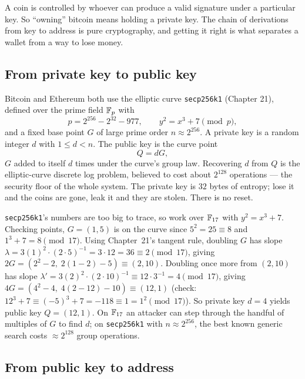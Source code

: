 A coin is controlled by whoever can produce a valid signature under a particular key. So ``owning'' bitcoin means holding a private key. The chain of derivations from key to address is pure cryptography, and getting it right is what separates a wallet from a way to lose money.

\subsection{From private key to public key}
\label{ch36:keys}

Bitcoin and Ethereum both use the elliptic curve \texttt{secp256k1} (Chapter 21), defined over the prime field $\mathbb{F}_p$ with
\[
  p = 2^{256} - 2^{32} - 977,\qquad y^2 = x^3 + 7 \pmod p,
\]
and a fixed base point $G$ of large prime order $n \approx 2^{256}$. A private key is a random integer $d$ with $1 \le d < n$. The public key is the curve point
\[
  Q = dG,
\]
$G$ added to itself $d$ times under the curve's group law. Recovering $d$ from $Q$ is the elliptic-curve discrete log problem, believed to cost about $2^{128}$ operations --- the security floor of the whole system. The private key is $32$ bytes of entropy; lose it and the coins are gone, leak it and they are stolen. There is no reset.

\begin{example}
\label{ch36:ex-curve}
\texttt{secp256k1}'s numbers are too big to trace, so work over $\mathbb{F}_{17}$ with $y^2 = x^3 + 7$. Checking points, $G = (1,5)$ is on the curve since $5^2 = 25 \equiv 8$ and $1^3+7 = 8 \pmod{17}$. Using Chapter~21's tangent rule, doubling $G$ has slope $\lambda = 3(1)^2 \cdot (2\cdot 5)^{-1} = 3 \cdot 12 = 36 \equiv 2 \pmod{17}$, giving $2G = (2^2 - 2,\; 2(1 - 2) - 5) \equiv (2, 10)$. Doubling once more from $(2, 10)$ has slope $\lambda' = 3(2)^2 \cdot (2\cdot 10)^{-1} \equiv 12 \cdot 3^{-1} = 4 \pmod{17}$, giving $4G = (4^2 - 4,\; 4(2 - 12) - 10) \equiv (12, 1)$ (check: $12^3 + 7 \equiv (-5)^3 + 7 = -118 \equiv 1 = 1^2 \pmod{17}$). So private key $d = 4$ yields public key $Q = (12, 1)$. On $\mathbb{F}_{17}$ an attacker can step through the handful of multiples of $G$ to find $d$; on \texttt{secp256k1} with $n \approx 2^{256}$, the best known generic search costs $\approx 2^{128}$ group operations.
\end{example}

\subsection{From public key to address}
\label{ch36:addr}

